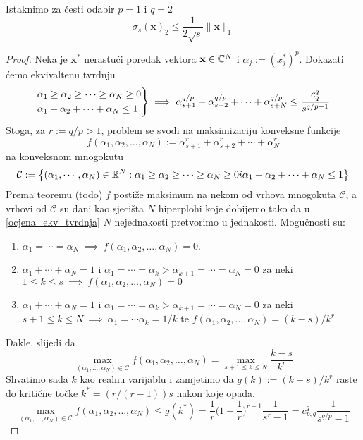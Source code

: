 \documentclass[a4paper,twoside,12pt]{memoir} %
\newcommand{\vect}[1]{\mathbf{#1}}
\begin{document}
Istaknimo za \v{c}esti odabir $p=1$ i $q=2$
\begin{equation*}
    \sigma_s(\vect{x})_2 \leq \frac{1}{2\sqrt{s}}\|\vect{x}\|_1
\end{equation*}
\begin{proof}
    Neka je $\vect{x}^*$ nerastu\'ci poredak vektora $\vect{x}\in\C^N$ i $\alpha_j := (x_j^*)^p$. Dokazati \'cemo ekvivaltenu tvrdnju
    \begin{equation}\label{ocjena_ekv_tvrdnja}
    \begin{rcases}
{\alpha_1 \geq \alpha_2 \geq \cdots \geq \alpha_N \geq 0} \\
{\alpha_1 + \alpha_2 + \cdots + \alpha_N \leq 1} 
\end{rcases}\implies \alpha_{s+1}^{q/p} + \alpha_{s+2}^{q/p} + \cdots + \alpha_{s+N}^{q/p} \leq \frac{c^q_{q}}{s^{q/p-1}}
    \end{equation}
    Stoga, za $r:=q/p>1$, problem se svodi na maksimizaciju konveksne funkcije
    $$
    f(\alpha_1, \alpha_2, \dots, \alpha_N) := \alpha_{s+1}^r + \alpha_{s+2}^r + \cdots +\alpha_{N}^r
    $$
    na konveksnom mnogokutu
    $$
    \mathcal{C} := \big\{ (\alpha_1, \cdots, \alpha_N)\in \mathbb{R}^N :  \alpha_1 \geq \alpha_2 \geq \cdots \geq \alpha_N \geq 0 i  \alpha_1 + \alpha_2 + \cdots + \alpha_N \leq 1\big\}
    $$
    Prema teoremu (todo) $f$ posti\v{z}e maksimum na nekom od vrhova mnogokuta $\mathcal{C}$, a vrhovi od $\mathcal{C}$ su dani kao sjeci\v{s}ta  $N$ hiperplohi koje dobijemo tako da u \eqref{ocjena_ekv_tvrdnja} $N$ nejednakosti pretvorimo u jednakosti. Mogu\v{c}nosti su:
    \begin{enumerate}
        \item $\alpha_1=\cdots=\alpha_N \ \implies\  f(\alpha_1, \alpha_2, \dots, \alpha_N) = 0$.
        \item $\alpha_1+\cdots+\alpha_N=1$ i $\alpha_1=\cdots=\alpha_k>\alpha_{k+1}=\cdots=\alpha_N=0$ za neki \\ $1\leq k \leq s \  \implies \  f(\alpha_1, \alpha_2, \dots, \alpha_N) = 0$
        \item $\alpha_1+\cdots+\alpha_N=1$ i $\alpha_1=\cdots=\alpha_k>\alpha_{k+1}=\cdots=\alpha_N=0$ za neki\\ $s+1\leq k \leq N \  \implies \  \alpha_1=\cdots\alpha_k=1/k$ te $f(\alpha_1, \alpha_2, \dots, \alpha_N) = (k-s)/k^r$
    \end{enumerate}
    Dakle, slijedi da 
    $$
    \max\limits_{(\alpha_1,\dots,\alpha_N)\in\mathcal{C}} f(\alpha_1, \alpha_2, \dots, \alpha_N) = \max\limits_{s+1\leq k \leq N} \frac{k-s}{k^r}
    $$
    Shvatimo sada $k$ kao realnu varijablu i zamjetimo da $g(k):=(k-s)/k^r$ raste do kriti\v{c}ne to\v{c}ke $k^*=(r/(r-1))s$ nakon koje opada.
    $$
    \max\limits_{(\alpha_1,\dots,\alpha_N)\in\mathcal{C}} f(\alpha_1, \alpha_2, \dots, \alpha_N) \leq g(k^*) = \frac{1}{r}\bigg( 1- \frac{1}{r}\bigg)^{r-1}\frac{1}{s^r-1}=c^q_{p,q}\frac{1}{s^{q/p}-1}
    $$
\end{proof}
\end{document}
